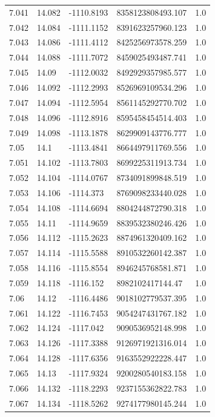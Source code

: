 \begin{tabular}{lllll}
7.041 & 14.082 & -1110.8193 & 8358123808493.107 & 1.0 \\
7.042 & 14.084 & -1111.1152 & 8391623257960.123 & 1.0 \\
7.043 & 14.086 & -1111.4112 & 8425256973578.259 & 1.0 \\
7.044 & 14.088 & -1111.7072 & 8459025493487.741 & 1.0 \\
7.045 & 14.09 & -1112.0032 & 8492929357985.577 & 1.0 \\
7.046 & 14.092 & -1112.2993 & 8526969109534.296 & 1.0 \\
7.047 & 14.094 & -1112.5954 & 8561145292770.702 & 1.0 \\
7.048 & 14.096 & -1112.8916 & 8595458454514.403 & 1.0 \\
7.049 & 14.098 & -1113.1878 & 8629909143776.777 & 1.0 \\
7.05 & 14.1 & -1113.4841 & 8664497911769.556 & 1.0 \\
7.051 & 14.102 & -1113.7803 & 8699225311913.734 & 1.0 \\
7.052 & 14.104 & -1114.0767 & 8734091899848.519 & 1.0 \\
7.053 & 14.106 & -1114.373 & 8769098233440.028 & 1.0 \\
7.054 & 14.108 & -1114.6694 & 8804244872790.318 & 1.0 \\
7.055 & 14.11 & -1114.9659 & 8839532380246.426 & 1.0 \\
7.056 & 14.112 & -1115.2623 & 8874961320409.162 & 1.0 \\
7.057 & 14.114 & -1115.5588 & 8910532260142.387 & 1.0 \\
7.058 & 14.116 & -1115.8554 & 8946245768581.871 & 1.0 \\
7.059 & 14.118 & -1116.152 & 8982102417144.47 & 1.0 \\
7.06 & 14.12 & -1116.4486 & 9018102779537.395 & 1.0 \\
7.061 & 14.122 & -1116.7453 & 9054247431767.182 & 1.0 \\
7.062 & 14.124 & -1117.042 & 9090536952148.998 & 1.0 \\
7.063 & 14.126 & -1117.3388 & 9126971921316.014 & 1.0 \\
7.064 & 14.128 & -1117.6356 & 9163552922228.447 & 1.0 \\
7.065 & 14.13 & -1117.9324 & 9200280540183.158 & 1.0 \\
7.066 & 14.132 & -1118.2293 & 9237155362822.783 & 1.0 \\
7.067 & 14.134 & -1118.5262 & 9274177980145.244 & 1.0 \\

\end{tabular}
